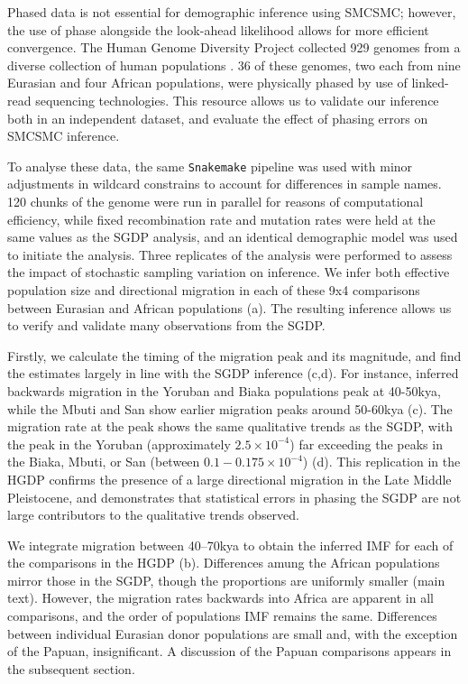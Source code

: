 Phased data is not essential for demographic inference using SMCSMC; however, the use of phase alongside the look-ahead likelihood allows for more efficient convergence. The Human Genome Diversity Project collected 929 genomes from a diverse collection of human populations \cite{Bergstrom2019}. 36 of these genomes, two each from nine Eurasian and four African populations, were physically phased by use of linked-read sequencing technologies. This resource allows us to validate our inference both in an independent dataset, and evaluate the effect of phasing errors on SMCSMC inference.   

To analyse these data, the same {\tt Snakemake} pipeline was used with minor adjustments in wildcard constrains to account for differences in sample names. 120 chunks of the genome were run in parallel for reasons of computational efficiency, while fixed recombination rate and mutation rates were held at the same values as the SGDP analysis, and an identical demographic model was used to initiate the analysis. Three replicates of the analysis were performed to assess the impact of stochastic sampling variation on inference. We infer both effective population size and directional migration in each of these 9x4 comparisons between Eurasian and African populations (a). The resulting inference allows us to verify and validate many observations from the SGDP.

Firstly, we calculate the timing of the migration peak and its magnitude, and find the estimates largely in line with the SGDP inference (c,d). For instance, inferred backwards migration in the Yoruban and Biaka populations peak at 40-50kya, while the Mbuti and San show earlier migration peaks around 50-60kya (c). The migration rate at the peak shows the same qualitative trends as the SGDP, with the peak in the Yoruban (approximately $2.5\times10^{-4}$) far exceeding the peaks in the Biaka, Mbuti, or San (between $0.1-0.175\times10^{-4}$) (d). This replication in the HGDP confirms the presence of a large directional migration in the Late Middle Pleistocene, and demonstrates that statistical errors in phasing the SGDP are not large contributors to the qualitative trends observed. 

We integrate migration between 40--70kya to obtain the inferred IMF for each of the comparisons in the HGDP (b). Differences amung the African populations mirror those in the SGDP, though the proportions are uniformly smaller (main text). However, the migration rates backwards into Africa are apparent in all comparisons, and the order of populations IMF remains the same. Differences between individual Eurasian donor populations are small and, with the exception of the Papuan, insignificant. A discussion of the Papuan comparisons appears in the subsequent section.  


